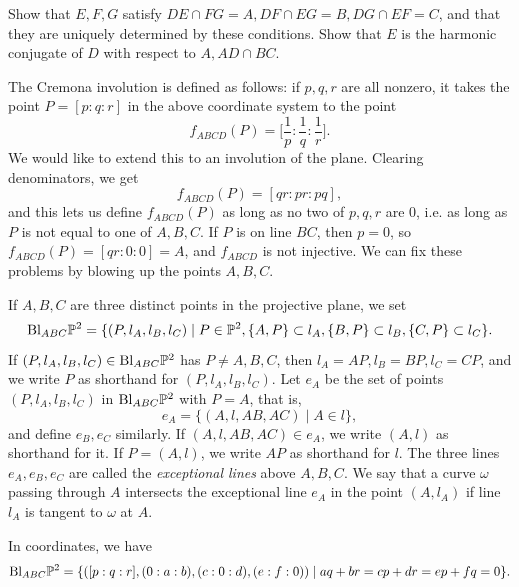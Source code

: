 \begin{exer} Show that $E,F,G$ satisfy $DE \cap FG = A, DF \cap EG = B, DG \cap EF = C$, and that they are uniquely determined by these conditions. Show that $E$ is the harmonic conjugate of $D$ with respect to $A, AD\cap BC$.
\end{exer}

The Cremona involution is defined as follows: if $p,q,r$ are all nonzero, it takes the point $P = [p:q:r]$ in the above coordinate system to the point
\[
f_{ABCD}(P) = \Big[\frac{1}{p}:\frac{1}{q}:\frac{1}{r}\Big].
\]
We would like to extend this to an involution of the plane. Clearing denominators, we get
\[
f_{ABCD}(P) = [qr:pr:pq],
\]
and this lets us define $f_{ABCD}(P)$ as long as no two of $p,q,r$ are $0$, i.e. as long as $P$ is not equal to one of $A,B,C$. If $P$ is on line $BC$, then $p=0$, so $f_{ABCD}(P) = [qr:0:0] = A$, and $f_{ABCD}$ is not injective. We can fix these problems by blowing up the points $A,B,C$.

\begin{defn} If $A,B,C$ are three distinct points in the projective plane, we set
\[
\text{\rm Bl}_{ABC}\mathbb{P}^2 = \{(P,l_A,l_B,l_C)\mid P \in \mathbb{P}^2, \{A,P\} \subset l_A, \{B,P\} \subset l_B, \{C,P\} \subset l_C\}.
\]
If $(P,l_A,l_B,l_C) \in \text{\rm Bl}_{ABC}\mathbb{P}^2$ has $P \ne A,B,C$, then $l_A = AP, l_B = BP, l_C = CP$, and we write $P$ as shorthand for $(P,l_A,l_B,l_C)$. Let $e_A$ be the set of points $(P,l_A,l_B,l_C)$ in $\text{\rm Bl}_{ABC}\mathbb{P}^2$ with $P = A$, that is,
\[
e_A = \{(A,l,AB,AC) \mid A\in l\},
\]
and define $e_B, e_C$ similarly. If $(A,l,AB,AC)\in e_A$, we write $(A,l)$ as shorthand for it. If $P = (A,l)$, we write $AP$ as shorthand for $l$. The three lines $e_A, e_B, e_C$ are called the \emph{exceptional lines} above $A,B,C$. We say that a curve $\omega$ passing through $A$ intersects the exceptional line $e_A$ in the point $(A,l_A)$ if line $l_A$ is tangent to $\omega$ at $A$.
\end{defn}

In coordinates, we have
\[
\text{\rm Bl}_{ABC}\mathbb{P}^2 = \{([p:q:r],(0:a:b),(c:0:d),(e:f:0))\mid aq+br = cp+dr = ep+fq = 0\}.
\]

